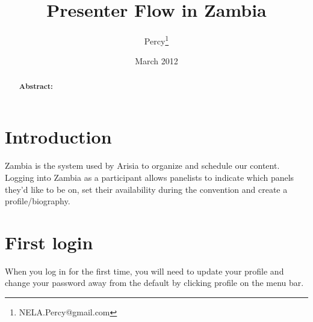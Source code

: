 \documentclass[captions=tablesignature]{scrartcl}
\author{Percy\thanks{NELA.Percy@gmail.com}}
\date{March 2012}
\title{Presenter Flow in Zambia}
\begin{document}
\maketitle
{}
\thispagestyle{fancy}
\renewcommand{\headrulewidth}{0pt}
\renewcommand{\footrulewidth}{0pt}
\lhead{}
\rhead{}
\chead{}
\lfoot{}
\cfoot{}
\rfoot{}
\begin{abstract}
\vspace{5cm}
{\LARGE{\textbf{Abstract:\\}}}

\end{abstract}
\newpage
\renewcommand{\headrulewidth}{1pt}
\renewcommand{\footrulewidth}{1pt}
\rfoot{\thepage}
\setcounter{tocdepth}{3}
\tableofcontents
\listoffigures
\listoftables
\newpage
{}
\section{Introduction}
\label{sec-1}
Zambia is the system used by Arisia to organize and schedule our
content.  Logging into Zambia as a participant allows panelists to
indicate which panels they’d like to be on, set their availability
during the convention and create a profile/biography.

\section{First login}
\label{sec-2}
When you log in for the first time, you will need to update your
profile and change your password away from the default by clicking
profile on the menu bar.
\end{document}

